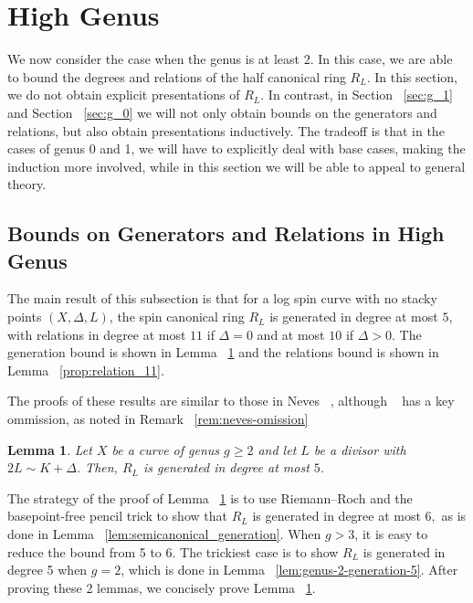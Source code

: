\documentclass{amsart}
\theoremstyle{plain}
\newtheorem{lem}[thm]{Lemma}
\theoremstyle{definition}
\theoremstyle{remark}
\numberwithin{equation}{section}
\newcommand\ssec{\subsection}
\begin{document}


\section{High Genus}
\label{sec:g_high}
We now consider the case when the genus is at least 2. In this case, we are able to bound the degrees and relations of the half canonical ring $R_L$. In this section, we do not obtain explicit presentations of $R_L.$ In contrast, in Section ~\ref{sec:g_1} and Section ~\ref{sec:g_0} we will not only obtain bounds on the generators and relations, but also obtain presentations inductively. The tradeoff is that in the cases of genus 0 and 1, we will have to explicitly deal with base cases, making the induction more involved, while in this section we will be able to appeal to general theory.

\ssec{Bounds on Generators and Relations in High Genus}

The main result of this subsection is that for a log spin curve with no stacky points $(X,\Delta,L)$, the spin canonical ring $R_L$ is generated in degree at most $5$, with relations in degree at most $11$ if $\Delta = 0$ and at most $10$ if $\Delta > 0$. The generation bound is shown in Lemma ~\ref{lem:generation_5} and the relations bound is shown in Lemma ~\ref{prop:relation_11}. 

The proofs of these results are similar to those in Neves ~\cite[Proposition III.4 and Proposition III.12]{neves:halfcan}, although ~\cite[Proposition III.4]{neves:halfcan} has a key ommission, as noted in Remark ~\ref{rem:neves-omission}

\begin{lem}
\label{lem:generation_5}
Let $X$ be a curve of genus $g \geq 2$ and let $L$ be a divisor with $2 L \sim K +\Delta$. Then, $R_L$ is generated in degree at most $5$.
\end{lem}

The strategy of the proof of Lemma ~\ref{lem:generation_5} is to use Riemann--Roch and the basepoint-free pencil trick to show that $R_L$ is generated in degree at most $6,$ as is done in Lemma ~\ref{lem:semicanonical_generation}. When $g > 3$, it is easy to reduce the bound from 5 to 6. The trickiest case is to show $R_L$ is generated in degree 5 when $g = 2$, which is done in Lemma ~\ref{lem:genus-2-generation-5}. After proving these 2 lemmas, we concisely prove Lemma ~\ref{lem:generation_5}.
\end{document}
